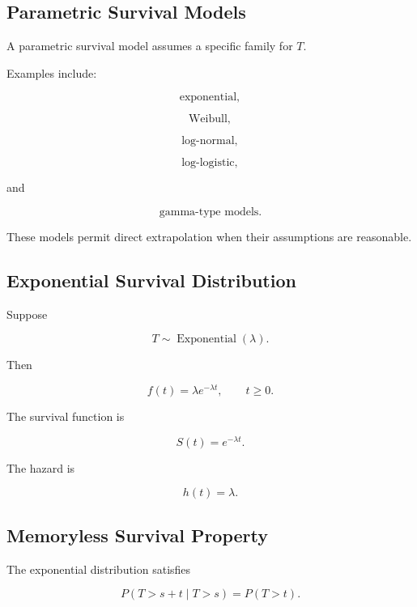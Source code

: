 \subsection{Parametric Survival Models}
\label{subsec:parametric-survival-models}

A parametric survival model assumes a specific family for \(T\).

Examples include:

\[
\boxed{
\text{exponential},
}
\]

\[
\boxed{
\text{Weibull},
}
\]

\[
\boxed{
\text{log-normal},
}
\]

\[
\boxed{
\text{log-logistic},
}
\]

and

\[
\boxed{
\text{gamma-type models}.
}
\]

These models permit direct extrapolation when their assumptions are
reasonable.

\subsection{Exponential Survival Distribution}
\label{subsec:exponential-survival}

Suppose

\[
T
\sim
\operatorname{Exponential}(\lambda).
\]

Then

\[
\boxed{
f(t)
=
\lambda e^{-\lambda t},
\qquad
t\geq0.
}
\]

The survival function is

\[
\boxed{
S(t)
=
e^{-\lambda t}.
}
\]

The hazard is

\[
\boxed{
h(t)=\lambda.
}
\]

\subsection{Memoryless Survival Property}
\label{subsec:memoryless-survival}

The exponential distribution satisfies

\[
\boxed{
P
(
T>s+t
\mid
T>s
)
=
P(T>t).
}
\]

